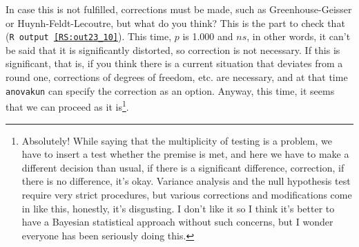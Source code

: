 \documentclass{ltjbook}
\begin{document}
In case this is not fulfilled, corrections must be made, such as Greenhouse-Geisser or Huynh-Feldt-Lecoutre, but what do you think? This is the part to check that (\texttt{R output \ref{RS:out23_10}}). This time, $p$ is 1.000 and $ns$, in other words, it can't be said that it is significantly distorted, so correction is not necessary. If this is significant, that is, if you think there is a current situation that deviates from a round one, corrections of degrees of freedom, etc. are necessary, and at that time \texttt{anovakun} can specify the correction as an option. Anyway, this time, it seems that we can proceed as it is\footnote{Absolutely! While saying that the multiplicity of testing is a problem, we have to insert a test whether the premise is met, and here we have to make a different decision than usual, if there is a significant difference, correction, if there is no difference, it's okay. Variance analysis and the null hypothesis test require very strict procedures, but various corrections and modifications come in like this, honestly, it's disgusting. I don't like it so I think it's better to have a Bayesian statistical approach without such concerns, but I wonder everyone has been seriously doing this.}.
\end{document}
